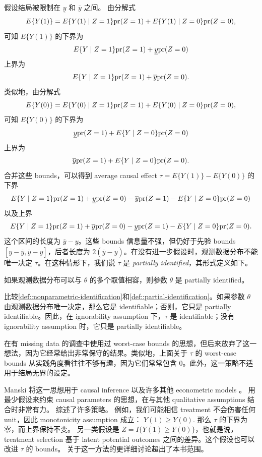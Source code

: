 假设结局被限制在 $\underline{y}$ 和 $\overline{y}$ 之间。
由分解式
$$
E\{  Y(1) \} = E\{  Y(1) \mid Z=1\} \textup{pr}(Z=1)  +  E\{  Y(1) \mid Z=0\} \textup{pr}(Z=0)  ,
$$
可知 $E\{  Y(1) \}$ 的下界为
$$
E\{  Y \mid Z=1\} \textup{pr}(Z=1)  +   \underline{y} \textup{pr}(Z=0) 
$$
上界为
$$
E\{  Y \mid Z=1\} \textup{pr}(Z=1)  +  \overline{y} \textup{pr}(Z=0).
$$
类似地，由分解式
$$
E\{  Y(0) \} = E\{  Y(0) \mid Z=1\} \textup{pr}(Z=1)  +  E\{  Y(0) \mid Z=0\} \textup{pr}(Z=0)  ,
$$
可知 $E\{  Y(0) \}$ 的下界为
$$
\underline{y}\textup{pr}(Z=1)  +  E\{  Y \mid Z=0\} \textup{pr}(Z=0) 
$$
上界为
$$
 \overline{y} \textup{pr}(Z=1)  +  E\{  Y \mid Z=0\} \textup{pr}(Z=0). 
$$
合并这些 bounds，可以得到 average causal effect $\tau = E\{  Y(1) \} - E\{  Y(0) \}$ 的下界
$$
E\{  Y \mid Z=1\} \textup{pr}(Z=1)  +   \underline{y} \textup{pr}(Z=0) - \overline{y} \textup{pr}(Z=1)  -  E\{  Y \mid Z=0\} \textup{pr}(Z=0) 
$$
以及上界
$$
 E\{  Y \mid Z=1\} \textup{pr}(Z=1)  +  \overline{y} \textup{pr}(Z=0) - \underline{y}\textup{pr}(Z=1)  -   E\{  Y \mid Z=0\} \textup{pr}(Z=0). 
$$ 
这个区间的长度为 $\overline{y}-\underline{y}$。这些 bounds 信息量不强，但仍好于先验 bounds $[\underline{y}-\overline{y}, \overline{y}-\underline{y}]$，后者长度为 $2(\overline{y}-\underline{y})$。在没有进一步假设时，观测数据分布不能唯一决定 $\tau$。在这种情形下，我们说 $\tau$ 是 {\it partially identified}，其形式定义如下。


\begin{definition}
\label{def::partial-identification}
如果观测数据分布可以与 $\theta$ 的多个取值相容，则参数 $\theta$ 是 partially identified。
\end{definition}


比较\cref{def::nonparametric-identification}和\cref{def::partial-identification}。如果参数 $\theta$ 由观测数据分布唯一决定，那么它是 identifiable；否则，它只是 partially identifiable。因此，在 ignorability assumption 下，$\tau$ 是 identifiable；没有 ignorability assumption 时，它只是 partially identifiable。




\citet{cochran1953} 在有 missing data 的调查中使用过 worst-case bounds 的思想，但后来放弃了这一想法，因为它经常给出非常保守的结果。类似地，上面关于 $\tau$ 的 worst-case bounds 从实践角度看往往不够有趣，因为它们常常包含 $0$。此外，这一策略不适用于结局无界的设定。



Manski 将这一思想用于 causal inference \citep{manski1990nonparametric} 以及许多其他 econometric models \citep{manski2003partial}。
用最少假设来约束 causal parameters 的思想，在与其他 qualitative assumptions 结合时非常有力。\citet{manski2003partial} 综述了许多策略。
例如，我们可能相信 treatment 不会伤害任何 unit，因此 monotonicity assumption 成立：
$
Y(1)\geq Y(0) . 
$
那么 $\tau$ 的下界为零，而上界保持不变。
另一类假设是
$Z = I\{  Y(1) \geq Y(0) \}$，也就是说，treatment selection 基于 latent potential outcomes 之间的差异。这个假设也可以改进 $\tau$ 的 bounds。
关于这一方法的更详细讨论超出了本书范围。

